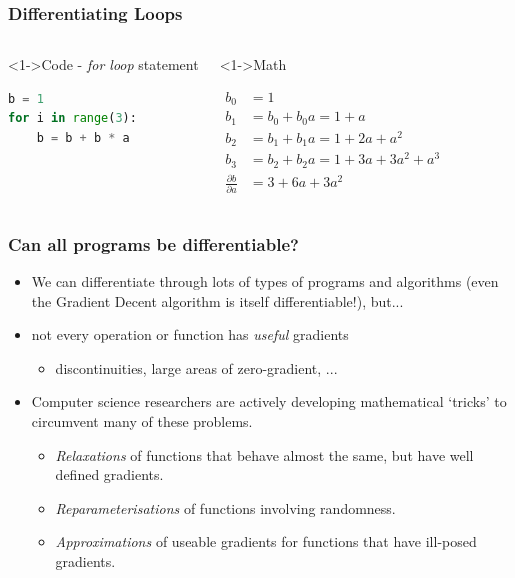 \documentclass[\beamerclass]{beamer}
\begin{document}
\begin{frame}[fragile]
\frametitle{Differentiating Loops}
\begin{columns}
    \begin{block}<1->{Code - \emph{for loop} statement}
    \begin{minipage}[c][3.5cm][c]{\linewidth} 
\begin{lstlisting}[language=python]
b = 1
for i in range(3):
    b = b + b * a
\end{lstlisting}
	\end{minipage}
    \end{block}

	\begin{block}<1->{Math}
	\begin{minipage}[c][3.5cm][c]{\linewidth}\vspace{-0.75cm}%
	\begin{align*}
	b_0 &= 1 \\
	b_1 &= b_0 + b_0 a = 1 + a \\
	b_2 &= b_1 + b_1 a = 1 + 2a + a^2 \\
	b_3 &= b_2 + b_2 a = 1 + 3a + 3a^2 + a^3 \\
	\frac{\partial b}{\partial a} &= 3 + 6a + 3a^2
	\end{align*}
   \end{minipage}
	\end{block}
\end{columns}
\end{frame}



\begin{frame}
\frametitle{Can all programs be differentiable?}

\begin{itemize}
	\item<+-> We can differentiate through lots of types of programs and algorithms (even the Gradient Decent algorithm is itself differentiable!), but...
	\item<+-> not every operation or function has \emph{useful} gradients
	\begin{itemize}
		\item<+-> discontinuities, large areas of zero-gradient, ...
	\end{itemize}
	\item<+-> Computer science researchers are actively developing mathematical `tricks' to circumvent many of these problems.
	\begin{itemize}
		\item \emph{Relaxations} of functions that behave almost the same, but have well defined gradients.
		\item \emph{Reparameterisations} of functions involving randomness.
		\item \emph{Approximations} of useable gradients for functions that have ill-posed gradients.
	\end{itemize}
\end{itemize}
\end{frame}
\end{document}
